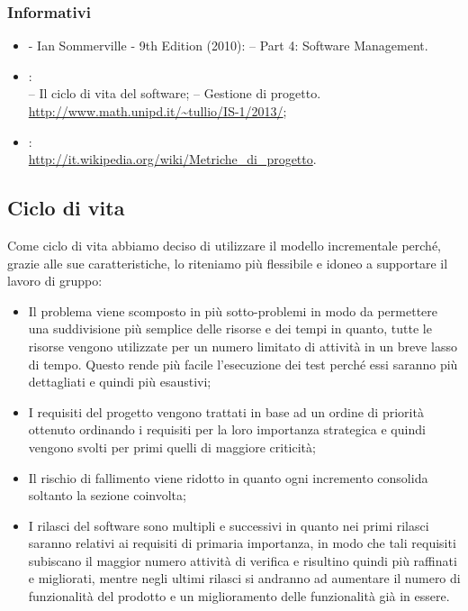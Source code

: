 \subsubsection{Informativi}
\label{2.4.2}
\begin{itemize}
\item {} - Ian Sommerville - 9th Edition (2010):
– Part 4: Software Management.
\item {}:\\
– Il ciclo di vita del software;
– Gestione di progetto.\\
\url{http://www.math.unipd.it/~tullio/IS-1/2013/};
\item {}:\\
\url{http://it.wikipedia.org/wiki/Metriche_di_progetto}.
\end{itemize}

\subsection{Ciclo di vita}
\label{2.5}
Come ciclo di vita abbiamo deciso di utilizzare il modello incrementale perché, grazie alle sue caratteristiche, lo riteniamo più flessibile e idoneo a supportare il lavoro di gruppo:
\begin{itemize}
\item Il problema viene scomposto in più sotto-problemi in modo da permettere una suddivisione più semplice delle risorse e dei tempi in quanto, tutte le risorse vengono utilizzate per un numero limitato di attività in un breve lasso di tempo. Questo rende più facile l'esecuzione dei test perché essi saranno più dettagliati e quindi più esaustivi;
\item I requisiti del progetto vengono trattati in base ad un ordine di priorità ottenuto ordinando i requisiti per la loro importanza strategica e quindi vengono svolti per primi quelli di maggiore criticità;
\item Il rischio di fallimento viene ridotto in quanto ogni incremento consolida soltanto la sezione coinvolta;
\item I rilasci del software sono multipli e successivi in quanto nei primi rilasci saranno relativi ai requisiti di primaria importanza, in modo che tali requisiti subiscano il maggior numero attività di verifica e risultino quindi più raffinati e migliorati, mentre negli ultimi rilasci si andranno ad aumentare il numero di funzionalità del prodotto e un miglioramento delle funzionalità già in essere.
\end{itemize}

